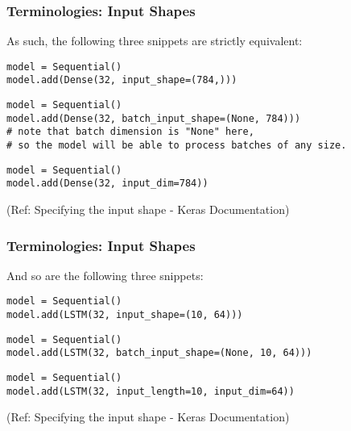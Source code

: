 \begin{frame}[fragile] \frametitle{Terminologies: Input Shapes}

As such, the following three snippets are strictly equivalent:

\begin{lstlisting}
model = Sequential()
model.add(Dense(32, input_shape=(784,)))
\end{lstlisting}

\begin{lstlisting}
model = Sequential()
model.add(Dense(32, batch_input_shape=(None, 784)))
# note that batch dimension is "None" here,
# so the model will be able to process batches of any size.
\end{lstlisting}

\begin{lstlisting}
model = Sequential()
model.add(Dense(32, input_dim=784))
\end{lstlisting}

\tiny{(Ref: Specifying the input shape - Keras Documentation)}
\end{frame}



\begin{frame}[fragile] \frametitle{Terminologies: Input Shapes}

And so are the following three snippets:

\begin{lstlisting}
model = Sequential()
model.add(LSTM(32, input_shape=(10, 64)))
\end{lstlisting}

\begin{lstlisting}
model = Sequential()
model.add(LSTM(32, batch_input_shape=(None, 10, 64)))
\end{lstlisting}

\begin{lstlisting}
model = Sequential()
model.add(LSTM(32, input_length=10, input_dim=64))
\end{lstlisting}

\tiny{(Ref: Specifying the input shape - Keras Documentation)}
\end{frame}


